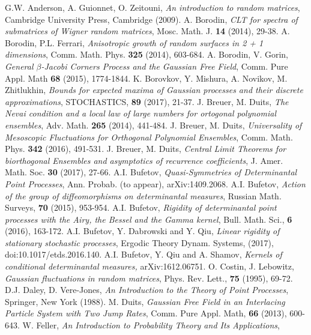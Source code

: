 \documentclass{article}
\numberwithin{equation}{section}
\newcommand{\be}{\beta}
\begin{document}
\begin{thebibliography}{0}
 G.W. Anderson, A. Guionnet, O. Zeitouni, {\it An introduction to random matrices}, Cambridge University Press,
    Cambridge (2009).
 A. Borodin, {\it CLT for spectra of submatrices of Wigner random matrices}, Mosc. Math. J. {\bf 14} (2014), 29-38.
 A. Borodin, P.L. Ferrari,
{\it Anisotropic growth of random surfaces in 2 + 1 dimensions},
Comm. Math. Phys. {\bf 325} (2014), 603-684.
 A. Borodin, V. Gorin, {\it General $\be$-Jacobi Corners Process and the Gaussian Free Field}, Comm. Pure Appl. Math	 {\bf 68} (2015), 1774-1844.
 K. Borovkov, Y. Mishura, A. Novikov, M. Zhitlukhin,
{\it Bounds for expected maxima of Gaussian processes and their discrete approximations},
STOCHASTICS, {\bf 89} (2017), 21-37.
 J. Breuer, M. Duits,
{\it The Nevai condition and a local law of large numbers for ortogonal polynomial ensembles}, Adv. Math. {\bf 265} (2014), 441-484.
 J. Breuer, M. Duits,
{\it Universality of Mesoscopic Fluctuations for Orthogonal Polynomial Ensembles},
Comm. Math. Phys. {\bf 342} (2016), 491-531.
 J. Breuer, M. Duits, {\it Central Limit Theorems for biorthogonal Ensembles
and asymptotics of recurrence coefficients}, J. Amer. Math. Soc. {\bf 30} (2017), 27-66.
 A.I. Bufetov, {\it Quasi-Symmetries of Determinantal Point Processes}, Ann. Probab. (to appear), arXiv:1409.2068.
 A.I. Bufetov, 
{\it Action of the group of diffeomorphisms on determinantal measures}, Russian Math. Surveys, {\bf 70} (2015), 953-954. 
 A.I. Bufetov, {\it Rigidity of determinantal point processes with the Airy, the Bessel and the Gamma kernel},
Bull. Math. Sci., {\bf 6} (2016), 163-172.
A.I. Bufetov, Y. Dabrowski and Y. Qiu,
{\it  {L}inear rigidity of stationary stochastic processes},
Ergodic Theory Dynam. Systems, (2017), doi:10.1017/etds.2016.140.
A.I. Bufetov, Y. Qiu and A. Shamov, {\it 
 Kernels of conditional determinantal measures,}
 arXiv:1612.06751.
  O. Costin, J. Lebowitz, {\it Gaussian fluctuations in random matrices}, Phys. Rev. Lett., {\bf 75} (1995), 69-72.
 D.J. Daley, D. Vere-Jones, {\it An Introduction to the Theory of Point Processes}, Springer, New York (1988).
 M. Duits, {\it Gaussian Free Field in an Interlacing Particle System with Two Jump Rates},
Comm. Pure Appl. Math, {\bf 66} (2013), 600-643.
 W. Feller, {\it An Introduction to Probability Theory and Its Applications},

\end{thebibliography}
\end{document}
